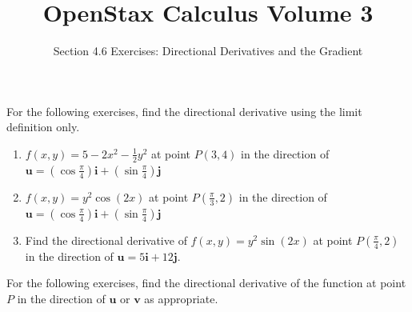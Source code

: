 \documentclass{exercises}
\title{OpenStax Calculus Volume 3}
\subtitle{Section 4.6 Exercises: Directional Derivatives and the Gradient}
\author{}
\date{}
\begin{document}
\maketitle


For the following exercises, find the directional derivative using the limit definition only.

\begin{enumerate}[start=1]
\item $f(x,y)=5-2x^{2}-\frac{1}{2}y^{2}$ at point $P(3,4)$ in the direction of $\mathbf{u}=(\cos \frac{\pi}{4})\mathbf{i}+(\sin \frac{\pi}{4})\mathbf{j}$
\item $f(x,y)=y^{2}\cos(2x)$ at point $P(\frac{\pi}{3},2)$ in the direction of $\mathbf{u}=(\cos \frac{\pi}{4})\mathbf{i}+(\sin \frac{\pi}{4})\mathbf{j}$
\item Find the directional derivative of $f(x,y)=y^{2}\sin(2x)$ at point $P(\frac{\pi}{4},2)$ in the direction of $\mathbf{u}=5\mathbf{i}+12\mathbf{j}$.
\end{enumerate}

For the following exercises, find the directional derivative of the function at point $P$ in the direction of $\mathbf{u}$ or $\mathbf{v}$ as appropriate.
\end{document}
